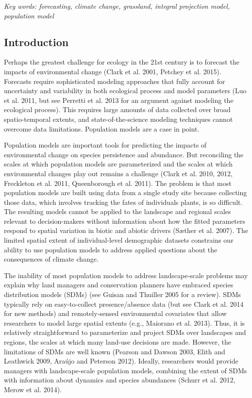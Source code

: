 \documentclass[12pt,]{article}
\begin{document}
\emph{Key words: forecasting, climate change, grassland, integral
projection model, population model}

\subsection{Introduction}\label{introduction}

Perhaps the greatest challenge for ecology in the 21st century is to
forecast the impacts of environmental change (Clark et al. 2001, Petchey
et al. 2015). Forecasts require sophisticated modeling approaches that
fully account for uncertainty and variability in both ecological process
and model parameters (Luo et al. 2011, but see Perretti et al. 2013 for
an argument against modeling the ecological process). This requires
large amounts of data collected over broad spatio-temporal extents, and
state-of-the-science modeling techniques cannot overcome data
limitations. Population models are a case in point.

Population models are important tools for predicting the impacts of
environmental change on species persistence and abundance. But
reconciling the scales at which population models are parameterized and
the scales at which environmental changes play out remains a challenge
(Clark et al. 2010, 2012, Freckleton et al. 2011, Queenborough et al.
2011). The problem is that most population models are built using data
from a single study site because collecting those data, which involves
tracking the fates of individuals plants, is so difficult. The resulting
models cannot be applied to the landscape and regional scales relevant
to decision-makers without information about how the fitted parameters
respond to spatial variation in biotic and abiotic drivers (Sæther et
al. 2007). The limited spatial extent of individual-level demographic
datasets constrains our ability to use population models to address
applied questions about the consequences of climate change.

The inability of most population models to address landscape-scale
problems may explain why land managers and conservation planners have
embraced species distribution models (SDMs) (see Guisan and Thuiller
2005 for a review). SDMs typically rely on easy-to-collect
presence/absence data (but see Clark et al. 2014 for new methods) and
remotely-sensed environmental covariates that allow researchers to model
large spatial extents (e.g., Maiorano et al. 2013). Thus, it is
relatively straightforward to parameterize and project SDMs over
landscapes and regions, the scales at which many land-use decisions are
made. However, the limitations of SDMs are well known (Pearson and
Dawson 2003, Elith and Leathwick 2009, Araújo and Peterson 2012).
Ideally, researchers would provide managers with landscape-scale
population models, combining the extent of SDMs with information about
dynamics and species abundances (Schurr et al. 2012, Merow et al. 2014).
\end{document}
